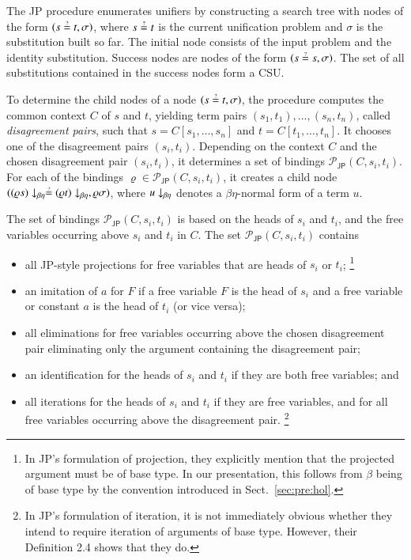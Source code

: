 %
%
The JP procedure enumerates unifiers by constructing a search tree with nodes of the form $(s \unif t, \sigma)$, where $s \unif t$ is the current unification
problem and $\sigma$ is the substitution built so far. 
The initial node consists of the input problem and the
identity substitution. Success nodes are nodes of the form $(s \unif s, \sigma)$.
The set of all substitutions contained in the success nodes form a CSU.

To determine the
child nodes of a node $(s \unif t, \sigma)$, the procedure  computes the common context $C$ of $s$ and $t$,
yielding term pairs $(s_1, t_1), \ldots, (s_n, t_n)$, called \emph{disagreement
pairs}, such that $s = C[s_1,\ldots,s_n]$ and $t = C[t_1,\ldots,t_n]$. It
chooses one of the disagreement pairs $(s_i, t_i)$.
Depending on the context $C$ and the chosen disagreement pair $(s_i, t_i)$,
it determines a set of bindings $\mathcal{P}_\mathsf{JP}(C,s_i, t_i)$.
For each of the bindings $\varrho\in\mathcal{P}_\mathsf{JP}(C,s_i, t_i)$, it creates a child node
$(\nf{(\varrho{s})}{\beta\eta} \unif \nf{(\varrho{t})}{\beta\eta}, \varrho\sigma)$,
where $\nf{u}{\beta\eta}$ denotes a
$\beta\eta$-normal form of a term $u$. 

The set of bindings $\mathcal{P}_\mathsf{JP}(C,s_i, t_i)$
is based on the heads of $s_i$ and $t_i$, and the free variables occurring above
$s_i$ and $t_i$ in $C$. The set $\mathcal{P}_\mathsf{JP}(C,s_i, t_i)$ contains
\begin{itemize}
  \item all JP-style projections for free variables that are heads of $s_i$ or $t_i$;%
\footnote{In JP's formulation of projection, they explicitly mention that the projected argument must be of base type. 
In our presentation, this follows from $\beta$ being of base type by the convention introduced in Sect.~\ref{sec:pre:hol}.}
  
  \item an imitation of $a$ for $F$ if a free variable $F$ is the head of $s_i$ and a free
  variable or constant $a$ is the head of $t_i$ (or vice versa);
  \item all eliminations for free variables occurring above the
  chosen disagreement pair
  eliminating only the argument containing the disagreement pair;
  \item an identification for the heads of $s_i$ and $t_i$ if they are both free variables; and
  \item all iterations for the heads of $s_i$ and
  $t_i$ if they are free variables, and for all free variables occurring above the disagreement pair.%
\footnote{In JP's formulation of iteration, it is not immediately obvious whether they intend to require iteration of arguments of base type.
However, their Definition 2.4 \cite{jp-76-unif} shows that they do.}
\end{itemize}


